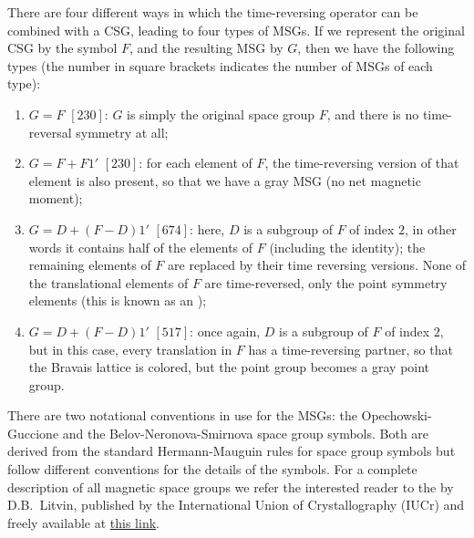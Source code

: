 There are four different ways in which the time-reversing operator can be combined with a CSG, leading to four types of MSGs.  If we represent the original CSG by the symbol $F$, and the resulting MSG by $G$, then we have the following types (the number in square brackets indicates the number of MSGs of each type):
\begin{enumerate}
	\item $G=F$ $[230]$: $G$ is simply the original space group $F$, and there is no time-reversal symmetry at all;
	\item $G=F+F1'$ $[230]$: for each element of $F$, the time-reversing version of that element is also present, so that we have a gray MSG (no net magnetic moment);
	\item $G=D+(F-D)1'$ $[674]$: here, $D$ is a subgroup of $F$ of index $2$, in other words it contains half of the elements of $F$ (including the identity); the remaining elements of $F$ are replaced by their time reversing versions.  None of the translational elements of $F$ are time-reversed, only the point symmetry elements (this is known as an );
	\item $G=D+(F-D)1'$ $[517]$: once again, $D$ is a subgroup of $F$ of index $2$, but in this case, every translation in $F$ has a time-reversing partner, so that the Bravais lattice is colored, but the point group becomes a gray point group.
\end{enumerate}

There are two notational conventions in use for the MSGs: the Opechowski-Guccione and the Belov-Neronova-Smirnova space group symbols. Both are derived from the standard Hermann-Mauguin rules for space group symbols but follow different conventions for the details of the symbols.  For a complete description of all magnetic space groups we refer the interested reader to the  by D.B.\ Litvin, published by the International Union of Crystallography (IUCr) and freely available at \href{https://www.iucr.org/publications/iucr/magnetic-group-tables}{this link}.









